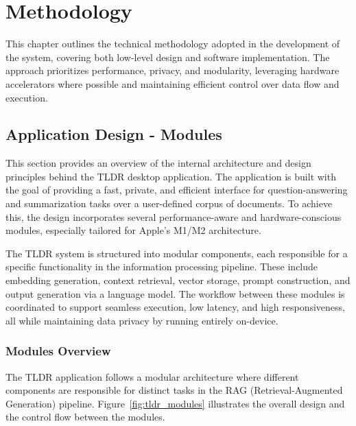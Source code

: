 \chapter{Methodology}
\label{ch:Methodology}
This chapter outlines the technical methodology adopted in the development of the system, covering both low-level design and software implementation. The approach prioritizes performance, privacy, and modularity, leveraging hardware accelerators where possible and maintaining efficient control over data flow and execution.


\section{Application Design - Modules}
\label{sec:ApplicationDesign-Modules}

This section provides an overview of the internal architecture and design principles behind the TLDR desktop application. The application is built with the goal of providing a fast, private, and efficient interface for question-answering and summarization tasks over a user-defined corpus of documents. To achieve this, the design incorporates several performance-aware and hardware-conscious modules, especially tailored for Apple’s M1/M2 architecture.

The TLDR system is structured into modular components, each responsible for a specific functionality in the information processing pipeline. These include embedding generation, context retrieval, vector storage, prompt construction, and output generation via a language model. The workflow between these modules is coordinated to support seamless execution, low latency, and high responsiveness, all while maintaining data privacy by running entirely on-device.


\subsection{Modules Overview}
\label{subsec:modules_overview}
The TLDR application follows a modular architecture where different components are responsible for distinct tasks in the RAG (Retrieval-Augmented Generation) pipeline. Figure~\ref{fig:tldr_modules} illustrates the overall design and the control flow between the modules.

